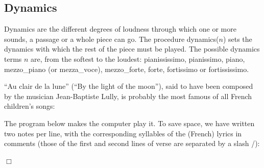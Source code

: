 \subsection{Dynamics}

Dynamics are the different degrees of loudness through which one or more sounds, a passage
or a whole piece can go. The procedure {\idt dynamics($n$)} sets the dynamics with which
the rest of the piece must be played. The possible dynamics terms $n$ are, from the softest to the loudest:
{\idt pia\-nis\-sis\-si\-mo},
{\idt pia\-nis\-si\-mo},
{\idt piano},
{\idt mezzo\_piano} (or {\idt mezza\_voce}),
{\idt mezzo\_forte},
{\idt forte},
{\idt fortissimo} or
{\idt for\-tis\-sis\-si\-mo}.

\begin{exemple}{\rm
``Au clair de la lune'' (``By the light of the moon''), said to have been composed by the musician Jean-Baptiste Lully,
is probably the most famous of all French children's songs:



\noindent The program below makes the computer play it. To
save space, we have written two notes per line, with the corresponding syllables
of the (French) lyrics in comments (those of the first and second lines of verse are separated by a
slash {\cmt /}):

 
\noindent $\Box$ }\end{exemple}


